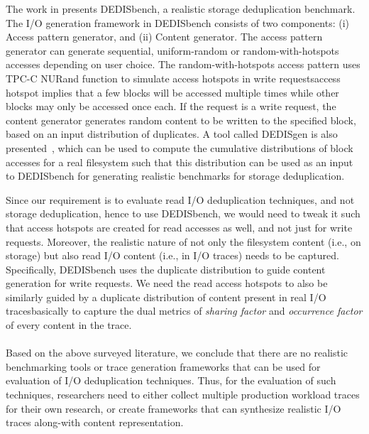 The work in \cite{dedis} presents DEDISbench, a realistic storage
deduplication benchmark. 
The I/O generation framework in DEDISbench consists of two
components: (i) Access pattern generator, and (ii) Content generator.
The access pattern generator can generate sequential, uniform-random
or random-with-hotspots accesses depending on user choice.
The random-with-hotspots access pattern
uses TPC-C NURand function to simulate
access hotspots in write requests\textemdash{}access hotspot implies that
a few blocks will be accessed multiple times while other blocks may 
only be accessed once each. 
If the request is a write request, the
content generator generates random content to be written to 
the specified block, based on an input distribution of 
duplicates.
A tool called DEDISgen is also
presented~\cite{dedis}, which can be used to compute the cumulative
distributions of block accesses for a real filesystem such that 
this distribution can be used as an input to DEDISbench for generating
realistic benchmarks for storage deduplication.

Since our requirement is to evaluate read I/O deduplication techniques,
and not storage deduplication, hence to use DEDISbench, we would need
to tweak it such that access hotspots are created for read accesses
as well, and not just for write requests. 
Moreover, the realistic nature of not only the filesystem content (i.e., on storage) 
but also read I/O content (i.e., in I/O traces)
needs to be captured. Specifically, DEDISbench uses the duplicate
distribution to guide content generation for write requests.
We need the read access hotspots to also be similarly guided by
a duplicate distribution of content present in real I/O 
traces\textemdash{}basically
to capture the dual metrics of \textit{sharing factor} and 
\textit{occurrence factor} of every content in the trace.
\\
\\
Based on the above surveyed literature, we conclude that there are no
realistic benchmarking tools or trace generation frameworks that can
be used for evaluation of I/O deduplication techniques. Thus, for the 
evaluation of such techniques, researchers need to either collect multiple
production workload traces for their own research, or create frameworks
that can synthesize realistic I/O traces along-with content representation.
% 
